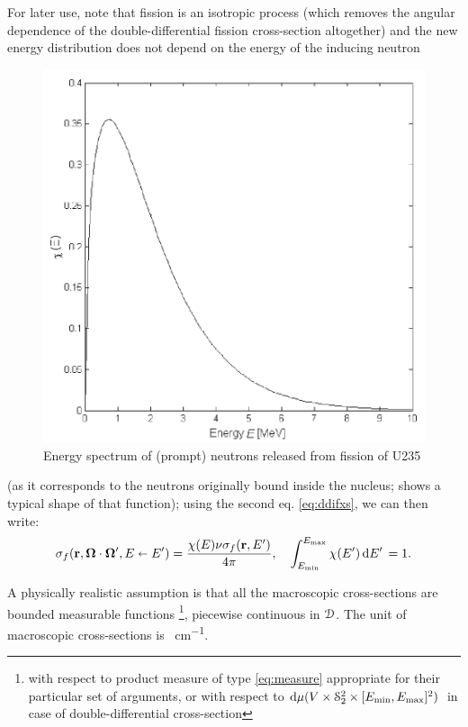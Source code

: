 For later use, note that fission is an isotropic process (which removes the angular dependence of the
double-differential fission cross-section altogether) and the new energy distribution does not depend on the energy of 
the inducing neutron 
\begin{figure}[hbt]
\begin{center}
  \includegraphics[scale=.6]{spectrum}
  \caption{Energy spectrum of (prompt) neutrons released from fission of U235}
  \label{fig:spectrum}
\end{center}
\end{figure}
(as it corresponds to the neutrons originally bound inside the nucleus; 
shows a typical shape of that function); using the second eq.
\eqref{eq:ddifxs}, we can then write:
\begin{equation}\label{eq:sf}
\sigma_f(\br,\bomega\cdot\bomega',E\sla E') = \frac{\chi(E)\nu\sigma_f(\br,E')}{4\pi},\quad 
\intE[']{\Emin}{\Emax}{\chi(E')} = 1.
\end{equation}
 
A physically realistic assumption is that all the macroscopic cross-sections are bounded measurable functions
 \footnote{with respect to product measure of type \eqref{eq:measure} appropriate for their particular set of arguments,
 or with respect to $\d{\mu(V\times\Sphere^2\times [\Emin,\Emax]^2)}$ in case of double-differential cross-section},
 piecewise continuous in $\VV$. The unit of macroscopic cross-sections is \SI{}{cm^{-1}}.

